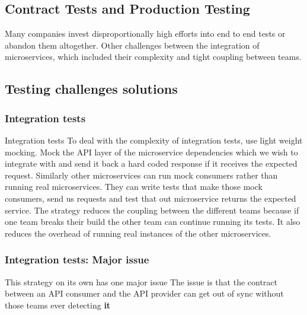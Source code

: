\subsection{Contract Tests and Production Testing}
Many companies invest disproportionally high efforts into end to end tests or abandon them altogether.
Other challenges between the integration of microservices, which included their complexity and tight coupling between teams.

\subsection{Testing challenges solutions}

\subsubsection{Integration tests}
Integration tests
To deal with the complexity of integration tests, use light weight mocking.
Mock the API layer of the microservice dependencies which we wish to integrate with and send it back a hard coded response if it receives the expected request.
Similarly other microservices can run mock consumers rather than running real microservices.
They can write tests that make those mock consumers, send us requests and test that out microservice returns the expected service.
The strategy reduces the coupling between the different teams because if one team breaks their build the other team can continue running its tests.
It also reduces the overhead of running real instances of the other microservices.

\subsubsection{Integration tests: Major issue}
This strategy on its own has one major issue
The issue is that the contract between an API consumer and the API provider can get out of sync without those teams ever detecting \textbf{it}

